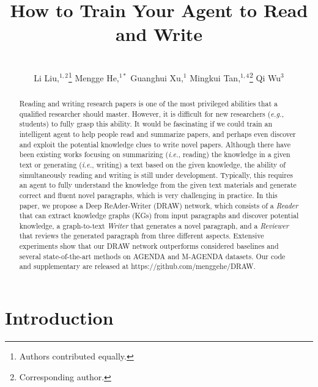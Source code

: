 \documentclass[letterpaper]{article}
\title{How to Train Your Agent to Read and Write}
\def\eg{\emph{e.g., }}
\begin{document}
\author{
\\
Li Liu,$^{1,2}$\thanks{Authors contributed equally.} Mengge He,$^{1*}$ Guanghui Xu,$^{1}$ Mingkui Tan,$^{1,4}$\thanks{Corresponding author.} Qi Wu$^{3}$
\\
}
\maketitle
\begin{abstract}
Reading and writing research papers is one of the most privileged abilities that a qualified researcher should master. However, it is difficult for new researchers (\eg{students}) to fully {grasp} this ability.
It would be fascinating if we could train an intelligent agent to help people read and summarize papers, and perhaps even discover and exploit the potential knowledge clues to write novel papers. 
Although there have been existing works focusing on summarizing (\emph{i.e.}, reading) the knowledge in a given text or generating (\emph{i.e.}, writing) a text based on the given knowledge, the ability of simultaneously reading and writing is still under development. Typically, this requires an agent to fully understand the knowledge from the given text materials and generate correct and fluent novel paragraphs, which is very challenging in practice.
In this paper, we propose a Deep ReAder-Writer (DRAW) network, which consists of a \textit{Reader} that can extract knowledge graphs (KGs) from input paragraphs and discover potential knowledge,
a graph-to-text \textit{Writer} that generates a novel paragraph, and a \textit{Reviewer} that reviews the generated paragraph from three different aspects. Extensive experiments show that our DRAW network outperforms considered baselines and several state-of-the-art methods on AGENDA and M-AGENDA datasets. Our code and supplementary are released at https://github.com/menggehe/DRAW.
\end{abstract}


\section{Introduction}
\end{document}
